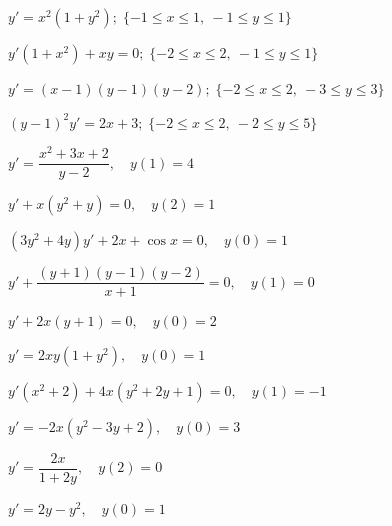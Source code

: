 \begin{exerciselist}
\item\label{exer:2.2.7}\CGex $y'=x^2(1+y^2);   \; \{-1\le x\le1,\
-1\le y\le1\}$


 \item\label{exer:2.2.8}\CGex$ y'(1+x^2)+xy=0 ;  \; \{-2\le x\le2,\ -1\le
y\le1\}$

\item\label{exer:2.2.9}\CGex $y'=(x-1)(y-1)(y-2);   \; \{-2\le x\le2,\
-3\le y\le3\}$


 \item\label{exer:2.2.10}\CGex $(y-1)^2y'=2x+3;   \; \{-2\le x\le2,\ -2\le
y\le5\}$


\item\label{exer:2.2.11}$y'=\dfrac{x^2+3x+2}{y-2}, \quad y(1)=4$

\item\label{exer:2.2.12}$y'+x(y^2+y)=0, \quad y(2)=1$


\item\label{exer:2.2.13}\CGex $(3y^2+4y)y'+2x+\cos x=0, \quad y(0)=1$



\item\label{exer:2.2.14}\CGex
$y'+\dfrac{(y+1)(y-1)(y-2)}{x+1}=0, \quad y(1)=0$

\item\label{exer:2.2.15}\CGex $y'+2x(y+1)=0, \quad y(0)=2$


\item\label{exer:2.2.16}\CGex $y'=2xy(1+y^2),\quad y(0)=1$


\item\label{exer:2.2.17}$y'(x^2+2)+ 4x(y^2+2y+1)=0, \quad y(1)=-1$

\item\label{exer:2.2.18}$y'=-2x(y^2-3y+2), \quad y(0)=3$

\end{exerciselist}
\begin{exerciselistTwoColumn}

\item\label{exer:2.2.19}$y'=\dfrac{2x}{1+2y},\quad y(2)=0$
\item\label{exer:2.2.20}$y'=2y-y^2,\quad y(0)=1$

\end{exerciselistTwoColumn}
